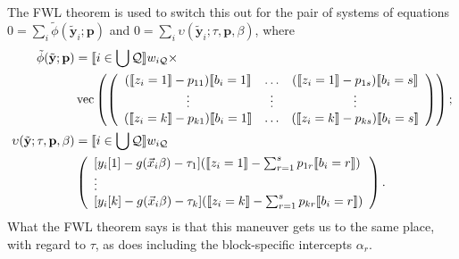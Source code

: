 \documentclass{article}
\DeclarePairedDelimiter{\indicator}{\llbracket}{\rrbracket}
\begin{document}
The FWL theorem is used to switch this out for the pair of systems of
equations $0 = \sum_{i}\tilde{\phi}(\tilde{\mathbf{y}}_{i}; \mathbf{p})$ and
$0= \sum_{i}\upsilon(\tilde{\mathbf{y}}_{i}; \tau, \mathbf{p},
\beta)$,  where
\begin{align}
  \tilde{\phi}(\tilde{\mathbf{y}}; \mathbf{p}) &=
                                                 \indicator{i \in \bigcup \mathcal{Q}} w_{i\mathcal{Q}} \times \nonumber \\
  &\operatorname{vec}\left(%
                                                 \left(
                                                 \begin{array}{ccc}
                                                   (\indicator{z_{i}=1}-p_{11})\indicator{b_{i}=1}&\ldots&(\indicator{z_{i}=1}-p_{1s})\indicator{b_{i}=s}
                                                   \\
                                                   \vdots & \vdots &
                                                                     \vdots
                                                   \\
                                                   (\indicator{z_{i}=k}-p_{k1})\indicator{b_{i}=1}&\ldots&(\indicator{z_{i}=k}-p_{ks})\indicator{b_{i}=s}\\                                                   
                                                 \end{array}
  \right)%
  \right) ;\nonumber \\
  \upsilon(\tilde{\mathbf{y}}; \tau, \mathbf{p}, \beta) &=
\indicator{i \in \bigcup \mathcal{Q}}w_{i\mathcal{Q}} \nonumber \\
&\left(
                                             \begin{array}{l}                                               
           [y_{i}[1]
                                               -
                                               g(\vec{x}_{i}\beta)-\tau_{1}](
                                               \indicator{z_{i}=1} - \sum_{r=1}^{s}p_{1r}\indicator{b_{i}=r})\\
                  \vdots \\
{}           [y_{i}[k]
                                               - g(\vec{x}_{i}\beta) -
                                               \tau_{k}](\indicator{z_{i}=k}
                                               - \sum_{r=1}^{s}p_{kr}\indicator{b_{i}=r})\\                                             \end{array}
\right) . \label{eq:upsilondef}
\end{align}
What the FWL theorem says is that this maneuver gets us to the same
place, with regard to $\tau$, as does including the block-specific
intercepts $\alpha_{r}$.
\end{document}
